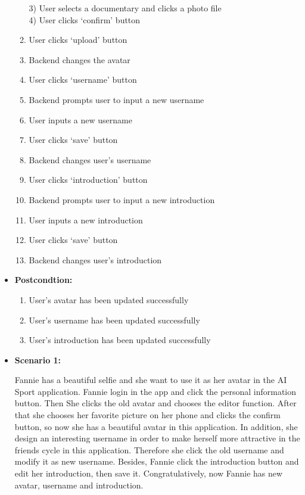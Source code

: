 \documentclass[a4paper]{article}
\begin{document}
\begin{itemize}
\begin{enumerate}[itemindent=1em]
    		\hspace*{0.7cm} 3)  User selects a documentary and clicks a photo file\\
    		\hspace*{0.7cm} 4)  User clicks `confirm' button
			\item User clicks `upload' button
			\item Backend changes the avatar
			\item User clicks `username' button
			\item Backend prompts user to input a new username
			\item User inputs a new username
			\item User clicks `save' button
			\item Backend changes user's username
			\item User clicks `introduction' button
			\item Backend prompts user to input a new introduction
			\item User inputs a new introduction
			\item User clicks `save' button
			\item Backend changes user's introduction
		\end{enumerate}
		\item[] \textbf{Postcondtion:}
		\begin{enumerate}[itemindent=1em]
			\item User's avatar has been updated successfully
			\item User's username has been updated successfully
			\item User's introduction has been updated successfully			
		\end{enumerate}
		\item[] \textbf{Scenario 1:}
		\par \hspace*{1cm} Fannie has a beautiful selfie and she want to use it as her avatar in the AI Sport application. Fannie login in the app and click the personal information button. Then She clicks the old avatar and chooses the editor function. After that she chooses her favorite picture on her phone and clicks the confirm button, so now she has a beautiful avatar in this application. In addition, she design an interesting username in order to make herself more attractive in the friends cycle in this application. Therefore she click the old username and modify it as new username. Besides, Fannie click the introduction button and edit her introduction, then save it. Congratulatively, now Fannie has new avatar, username and introduction.

\end{itemize}
\end{document}
